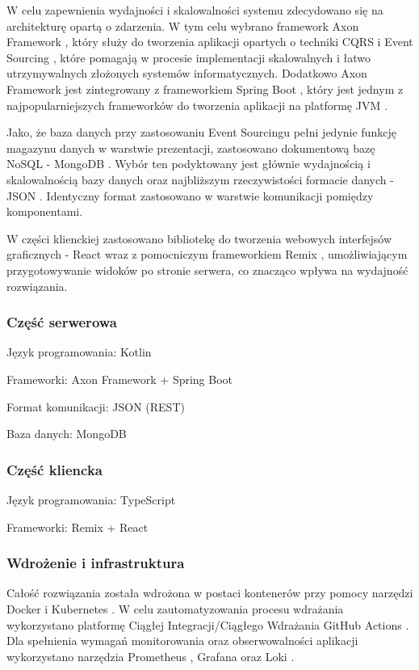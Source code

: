 W celu zapewnienia wydajności i skalowalności systemu zdecydowano się na architekturę opartą o zdarzenia. W tym celu wybrano framework Axon Framework \cite{axonframework}, który służy do tworzenia aplikacji opartych o techniki CQRS \cite{cqrs} i Event Sourcing \cite{eventsourcing}, które pomagają w procesie implementacji skalowalnych i łatwo utrzymywalnych złożonych systemów informatycznych. Dodatkowo Axon Framework jest zintegrowany z frameworkiem Spring Boot \cite{springboot}, który jest jednym z najpopularniejszych frameworków do tworzenia aplikacji na platformę JVM \cite{jvm}.

Jako, że baza danych przy zastosowaniu Event Sourcingu pełni jedynie funkcję magazynu danych w warstwie prezentacji, zastosowano dokumentową bazę NoSQL \cite{nosql} - MongoDB \cite{mongodb}. Wybór ten podyktowany jest głównie wydajnością i skalowalnością bazy danych oraz najbliższym rzeczywistości formacie danych - JSON \cite{json}. Identyczny format zastosowano w warstwie komunikacji pomiędzy komponentami.

W części klienckiej zastosowano bibliotekę do tworzenia webowych interfejsów graficznych - React \cite{react} wraz z pomocniczym frameworkiem Remix \cite{remix}, umożliwiającym przygotowywanie widoków po stronie serwera, co znacząco wpływa na wydajność rozwiązania.

\subsubsection{Część serwerowa}

Język programowania: Kotlin \cite{kotlin}

Frameworki: Axon Framework + Spring Boot

Format komunikacji: JSON (REST)

Baza danych: MongoDB

\subsubsection{Część kliencka}

Język programowania: TypeScript \cite{typescript}

Frameworki: Remix + React

\subsubsection{Wdrożenie i infrastruktura}

Całość rozwiązania została wdrożona w postaci kontenerów przy pomocy narzędzi Docker \cite{docker} i Kubernetes \cite{kubernetes}. W celu zautomatyzowania procesu wdrażania wykorzystano platformę Ciągłej Integracji/Ciągłego Wdrażania GitHub Actions \cite{githubactions}. Dla spełnienia wymagań monitorowania oraz obserwowalności aplikacji wykorzystano narzędzia Prometheus \cite{prometheus}, Grafana \cite{grafana} oraz Loki \cite{loki}.

